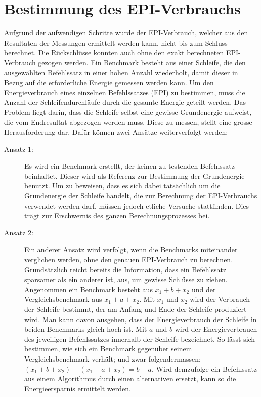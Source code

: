 \section{Bestimmung des EPI-Verbrauchs}
\label{sec:bestimmung_grundenergie}

Aufgrund der aufwendigen Schritte wurde der EPI-Verbrauch, welcher aus den Resultaten der Messungen ermittelt werden kann, nicht bis zum Schluss berechnet. Die Rückschlüsse konnten auch ohne den exakt berechneten EPI-Verbrauch gezogen werden. Ein Benchmark besteht aus einer Schleife, die den ausgewählten Befehlssatz in einer hohen Anzahl wiederholt, damit dieser in Bezug auf die erforderliche Energie gemessen werden kann. Um den Energieverbrauch eines einzelnen Befehlssatzes (EPI) zu bestimmen, muss die Anzahl der Schleifendurchläufe durch die gesamte Energie geteilt werden. Das Problem liegt darin, dass die Schleife selbst eine gewisse Grundenergie aufweist, die vom Endresultat abgezogen werden muss. Diese zu messen, stellt eine grosse Herausforderung dar. Dafür können zwei Ansätze weiterverfolgt werden:
\begin{description}
\item[Ansatz 1:]
Es wird ein Benchmark erstellt, der keinen zu testenden Befehlssatz beinhaltet. Dieser wird als Referenz zur Bestimmung der Grundenergie benutzt. Um zu beweisen, dass es sich dabei tatsächlich um die Grundenergie der Schleife handelt, die zur Berechnung der EPI-Verbrauchs verwendet werden darf, müssen jedoch etliche Versuche stattfinden. Dies trägt zur Erschwernis des ganzen Berechnungsprozesses bei. 
\par
\item[Ansatz 2:]
Ein anderer Ansatz wird verfolgt, wenn die Benchmarks miteinander verglichen werden, ohne den genauen EPI-Verbrauch zu berechnen. Grundsätzlich reicht bereits die Information, dass ein Befehlssatz sparsamer als ein anderer ist, aus, um gewisse Schlüsse zu ziehen. Angenommen ein Benchmark besteht aus $x_1 + b + x_2$ und der Vergleichsbenchmark aus $x_1 + a + x_2$. Mit $x_1$ und $x_2$ wird der Verbrauch der Schleife bestimmt, der am Anfang und Ende der Schleife produziert wird. Man kann davon ausgehen, dass der Energieverbrauch der Schleife in beiden Benchmarks gleich hoch ist. Mit $a$ und $b$ wird der Energieverbrauch des jeweiligen Befehlssatzes innerhalb der Schleife bezeichnet. So lässt sich bestimmen, wie sich ein Benchmark gegenüber seinem Vergleichsbenchmark verhält; und zwar folgendermassen: $(x_1 + b + x_2) - (x_1 + a + x_2) = b - a$. Wird demzufolge ein Befehlssatz aus einem Algorithmus durch einen alternativen ersetzt, kann so die Energieersparnis ermittelt werden.
\end{description}


